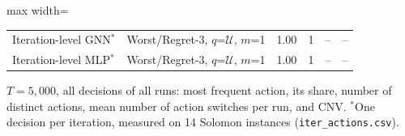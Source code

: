 \begin{table}[t]
\begin{adjustbox}{max width=\linewidth}
\begin{tabular}{llrrrr}
Iteration-level GNN$^{*}$ & Worst/Regret-3, $q$=$\mathcal U$, $m$=1 & 1.00 & 1 & -- & --\\
Iteration-level MLP$^{*}$ & Worst/Regret-3, $q$=$\mathcal U$, $m$=1 & 1.00 & 1 & -- & --\\
\bottomrule
\end{tabular}
\end{adjustbox}
\par\vspace{2pt}\parbox{\linewidth}{\footnotesize $T=5{,}000$, all decisions of all runs: most frequent action, its share, number of distinct actions, mean number of action switches per run, and CNV. $^{*}$One decision per iteration, measured on 14 Solomon instances (\texttt{iter\_actions.csv}).}
\end{table}
